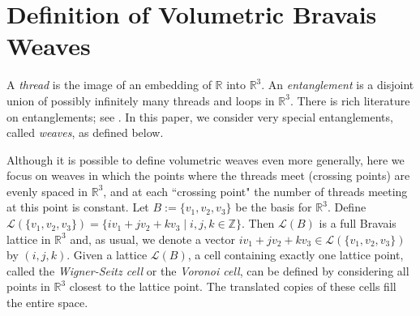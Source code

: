 \documentclass[unnumsec,webpdf,contemporary,large]{oup-authoring-template}%
\theoremstyle{thmstyleone}%
\theoremstyle{thmstyletwo}%
\theoremstyle{thmstylethree}%
\newcommand{\Z}{{\mathbb{Z}}}
\newcommand{\R}{{\mathbb{R}}}
\begin{document}


\section{Definition of Volumetric Bravais Weaves}

A \emph{thread} is the image of an embedding of $\R$ into $\R^3$. An \emph{entanglement} is a disjoint union of possibly infinitely many threads and loops in $\R^3$.
There is rich literature on entanglements; see \cite{periodic_entanglement_1,periodic_entanglement_2,3periodicentanglement,ideal_geometry_periodic_entanglement_2}.
In this paper, we consider very special entanglements, called \emph{weaves}, as defined below.

Although it is possible to define volumetric weaves even more generally, here we focus on weaves in which the points where the  threads meet (crossing points) are evenly spaced in $\R^3$, and at each ``crossing point" the number of threads meeting at this point is constant.
Let $B:=\{v_1, v_2, v_3\}$ be the basis for $\R^3.$
Define ${\mathcal L}(\{v_1,v_2, v_3\}) = \{ iv_1+jv_2+kv_3\mid i,j,k\in \Z\}$.
Then  ${\mathcal L}(B)$ is a full Bravais lattice in $\R^3$
and, as usual, we denote a vector $iv_1+jv_2+kv_3\in
{\mathcal L}(\{v_1,v_2, v_3\}) $ by $(i,j,k)$.  Given a lattice ${\mathcal L}(B)$, a cell containing exactly one lattice point, called the \emph{Wigner-Seitz cell} or the \emph{Voronoi cell}, can be defined by considering all points in $\R^3$ closest to the lattice point. The translated copies of these cells fill the entire space.
\end{document}
